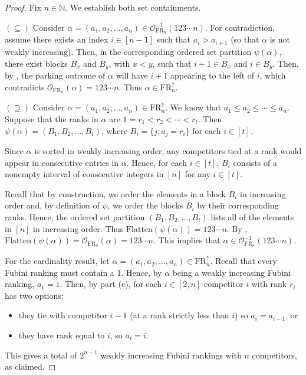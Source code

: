 \documentclass{amsart}
\newcommand{\Flatten}[0]{\mathrm{Flatten}}
\theoremstyle{definition}
\theoremstyle{definition}
\theoremstyle{remark}
\newcommand{\NN}{\mathbb{N}}
\newcommand{\FR}[1]{\mathrm{FR}_{#1}}
\newcommand{\out}{\mathcal{O}}
\begin{document}
\begin{proof}
    Fix $n\in\NN$. We establish both set containments.
    
    \noindent $(\subseteq)$ Consider $\alpha=(a_1,a_2,\ldots,a_n)\in\out_{\FR{n}}^{-1}(123\cdots n)$. 
    For contradiction, 
    assume there exists an index $i\in[n-1]$ such that $a_i>a_{i+1}$ (so that $\alpha$ is not weakly increasing). 
    Then, in the corresponding ordered set partition $\psi(\alpha)$, there exist blocks $B_x$ and $B_y$, with $x<y$, such that $i+1\in B_x$ and $i\in B_y$. Then, by , the parking outcome of $\alpha$ will have $i+1$ appearing to the left of $i$, which contradicts $\out_{\FR{n}}(\alpha)=123\cdots n$. Thus $\alpha\in\FR{n}^\uparrow$.

    
    \noindent $(\supseteq)$ Consider $\alpha=(a_1,a_2,\ldots,a_n)\in \FR{n}^\uparrow$. We know that $a_1\leq a_2\leq \cdots\leq a_n$.
    Suppose that the ranks in $\alpha$ are $1=r_1<r_2<\cdots<r_t$.
    Then $\psi(\alpha)=(B_1,B_2,\ldots,B_t)$, 
    where $B_i = \{j: a_j = r_i\}$ for each $i\in[t]$.
   
    Since $\alpha$ is sorted in weakly increasing order, 
    any competitors tied at a rank would appear in consecutive entries in $\alpha$. 
    Hence, for each $i\in[t]$, 
    $B_i$ consists of a nonempty interval of consecutive integers in $[n]$ for any $i\in[t]$.
   
    Recall that by construction, we order the elements in a block $B_i$ in increasing order and, by definition of $\psi$, we order the blocks $B_i$ by their corresponding ranks. 
    Hence, the ordered set partition $(B_1,B_2,\ldots,B_t)$ lists all of the elements in $[n]$ in increasing order. 
    Thus 
    $\Flatten(\psi(\alpha))=123\cdots n$.
    By , $\Flatten(\psi(\alpha))=\out_{\FR{n}}(\alpha)=123\cdots n$. 
    This implies that $\alpha\in\out^{-1}_{\FR{n}}(123\cdots n)$.
    
    
For the cardinality result, let $\alpha=(a_1,a_2,\ldots,a_n)\in\FR{n}^{\uparrow}$. Recall that every Fubini ranking must contain a 1. Hence, by $\alpha$ being a weakly increasing Fubini ranking, $a_1=1$. Then, by  part (c), for each $i\in[2,n]$ competitor $i$ with rank $r_i$ has two options: 
\begin{itemize}
    \item they tie with competitor $i-1$ (at a rank strictly less than $i$) so $a_i=a_{i-1}$, or
    \item they have rank equal to $i$, so $a_i=i$.
\end{itemize}

    This gives a total of $2^{n-1}$ weakly increasing Fubini rankings with $n$ competitors, as claimed.
\end{proof}
\end{document}
